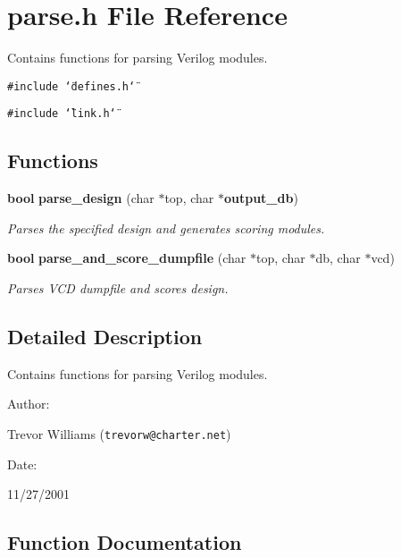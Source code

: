 \section{parse.h File Reference}
\label{parse_8h}
Contains functions for parsing Verilog modules. 


{\tt \#include \char`\"{}defines.h\char`\"{}}\par
{\tt \#include \char`\"{}link.h\char`\"{}}\par
\subsection*{Functions}
\begin{CompactItemize}
\item 
{\bf bool} {\bf parse\_\-design} (char $\ast$top, char $\ast${\bf output\_\-db})
\begin{CompactList}\small\item\em Parses the specified design and generates scoring modules.\item\end{CompactList}\item 
{\bf bool} {\bf parse\_\-and\_\-score\_\-dumpfile} (char $\ast$top, char $\ast$db, char $\ast$vcd)
\begin{CompactList}\small\item\em Parses VCD dumpfile and scores design.\item\end{CompactList}\end{CompactItemize}


\subsection{Detailed Description}
Contains functions for parsing Verilog modules.



\begin{Desc}
\item[Author: ]\par
Trevor Williams ({\tt trevorw@charter.net}) \end{Desc}
\begin{Desc}
\item[Date: ]\par
11/27/2001\end{Desc}


\subsection{Function Documentation}
